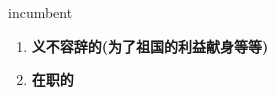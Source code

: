 
\begin{frame}
{\huge incumbent}
\begin{center}
\begin{enumerate}\Large
  \item \textbf{义不容辞的(为了祖国的利益献身等等)}
  \item \textbf{在职的}
\end{enumerate}
\end{center}
\end{frame}
